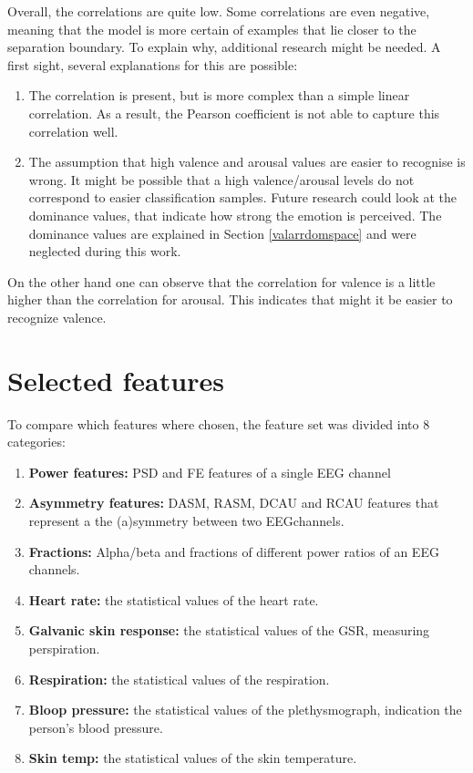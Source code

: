Overall, the correlations are quite low. Some correlations are even negative, meaning that the model is more certain of examples that lie closer to the separation boundary. To explain why, additional research might be needed. A first sight, several explanations for this are possible:
\begin{enumerate}
\item The correlation is present, but is more complex than a simple linear correlation. As a result, the Pearson coefficient is not able to capture this correlation well.
\item The assumption that high valence and arousal values are easier to recognise is wrong. It might be possible that a high valence/arousal levels do not correspond to easier classification samples. Future research could look at the dominance values, that indicate how strong the emotion is perceived. The dominance values are explained in Section \ref{valarrdomspace} and were neglected during this work.
\end{enumerate}

\npar

On the other hand one can observe that the correlation for valence is a little higher than the correlation for arousal. This indicates that might it be easier to recognize valence.

\section{Selected features}

To compare which features where chosen, the feature set was divided into 8 categories:
\begin{enumerate}
\item \textbf{Power features:} PSD and FE features of a single EEG channel
\item \textbf{Asymmetry features:} DASM, RASM, DCAU and RCAU features that represent a the (a)symmetry between two EEGchannels.
\item \textbf{Fractions:} Alpha/beta and fractions of different power ratios of an EEG channels.

\item \textbf{Heart rate:} the statistical values of the heart rate.
\item \textbf{Galvanic skin response:} the statistical values of the GSR, measuring perspiration.
\item \textbf{Respiration:} the statistical values of the respiration.
\item \textbf{Bloop pressure:} the statistical values of the plethysmograph, indication the person's blood pressure.
\item \textbf{Skin temp:} the statistical values of the skin temperature.
\end{enumerate} 

